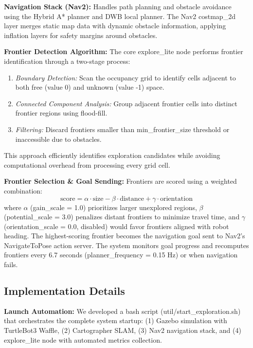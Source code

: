\documentclass[conference]{IEEEtran}
\begin{document}
\textbf{Navigation Stack (Nav2):} Handles path planning and obstacle avoidance using the Hybrid A* planner and DWB local planner. The Nav2 costmap\_2d layer merges static map data with dynamic obstacle information, applying inflation layers for safety margins around obstacles.

\textbf{Frontier Detection Algorithm:} The core explore\_lite node performs frontier identification through a two-stage process:
\begin{enumerate}
    \item \textit{Boundary Detection:} Scan the occupancy grid to identify cells adjacent to both free (value 0) and unknown (value -1) space.
    \item \textit{Connected Component Analysis:} Group adjacent frontier cells into distinct frontier regions using flood-fill.
    \item \textit{Filtering:} Discard frontiers smaller than min\_frontier\_size threshold or inaccessible due to obstacles.
\end{enumerate}

This approach efficiently identifies exploration candidates while avoiding computational overhead from processing every grid cell.

\textbf{Frontier Selection \& Goal Sending:} Frontiers are scored using a weighted combination:
\begin{equation}
    \text{score} = \alpha \cdot \text{size} - \beta \cdot \text{distance} + \gamma \cdot \text{orientation}
\end{equation}
where $\alpha$ (gain\_scale = 1.0) prioritizes larger unexplored regions, $\beta$ (potential\_scale = 3.0) penalizes distant frontiers to minimize travel time, and $\gamma$ (orientation\_scale = 0.0, disabled) would favor frontiers aligned with robot heading. The highest-scoring frontier becomes the navigation goal sent to Nav2's NavigateToPose action server. The system monitors goal progress and recomputes frontiers every 6.7 seconds (planner\_frequency = 0.15 Hz) or when navigation fails.

\subsection{Implementation Details}

\textbf{Launch Automation:} We developed a bash script (util/start\_exploration.sh) that orchestrates the complete system startup: (1) Gazebo simulation with TurtleBot3 Waffle, (2) Cartographer SLAM, (3) Nav2 navigation stack, and (4) explore\_lite node with automated metrics collection.
\end{document}
